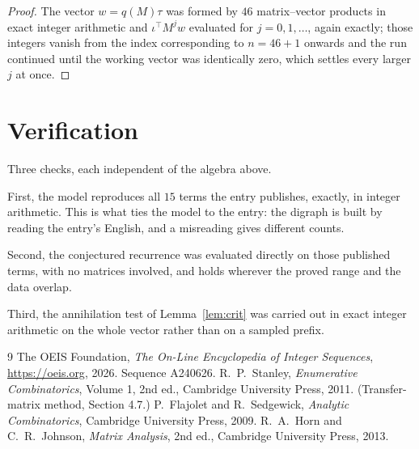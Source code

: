 \documentclass[11pt,a4paper]{article}
\theoremstyle{plain}
\theoremstyle{definition}
\begin{document}
\begin{proof}
The vector $w=q(M)\tau$ was formed by $46$ matrix--vector products in exact integer
arithmetic and $\iota^{\!\top}M^{j}w$ evaluated for $j=0,1,\dots$, again exactly; those
integers vanish from the index corresponding to $n=46+1$ onwards and the run continued
until the working vector was identically zero, which settles every larger $j$ at once.
\end{proof}

\section{Verification}

Three checks, each independent of the algebra above.

First, the model reproduces all $15$ terms the entry publishes, exactly, in integer
arithmetic. This is what ties the model to the entry: the digraph is built by reading the
entry's English, and a misreading gives different counts.

Second, the conjectured recurrence was evaluated directly on those published terms, with no
matrices involved, and holds wherever the proved range and the data overlap.

Third, the annihilation test of Lemma~\ref{lem:crit} was carried out in exact integer
arithmetic on the whole vector rather than on a sampled prefix.

\begin{thebibliography}{9}
 The OEIS Foundation, \emph{The On-Line Encyclopedia of Integer
Sequences}, \url{https://oeis.org}, 2026. Sequence A240626.
 R.~P.~Stanley, \emph{Enumerative Combinatorics}, Volume 1, 2nd ed.,
Cambridge University Press, 2011. (Transfer-matrix method, Section 4.7.)
 P.~Flajolet and R.~Sedgewick, \emph{Analytic Combinatorics}, Cambridge
University Press, 2009.
 R.~A.~Horn and C.~R.~Johnson, \emph{Matrix Analysis}, 2nd ed., Cambridge
University Press, 2013.
\end{thebibliography}
\end{document}
